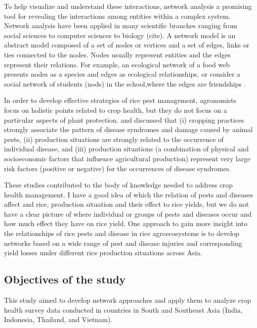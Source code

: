 To help visualize and understand these interactions, network analysis a promising tool for revealing the interactions among entities within a complex system. Network analysis have been applied in many scientific branches ranging from social sciences to computer sciences to biology (cite). A network model is an abstract model composed of a set of nodes or vertices and a set of edges, links or ties connected to the nodes. Nodes usually represent entities and the edges represent their relations. For example, an ecological network of a food web presents nodes as a species \citep{Krause_2003_Compartments}and edges as ecological relationships, or consider a social network of students (nods) in the school,where the edges are friendships \citep{Moody_2001_Race}.

In order to develop effective strategies of rice pest management, agronomists focus on holistic points related to crop health, but they do not focus on a particular aspects of plant protection. \citet{Savary_1995_Use,Savary_2000_Quantification} and \citet{Savary_2005_Multiple} discussed that (i) cropping practices strongly associate the pattern of disease syndromes and damage caused by animal pests, (ii) production situations are strongly related to the occurrence of individual disease, and (iii) production situations (a combination of physical and socioeconomic factors that influence agricultural production) represent very large risk factors (positive or negative) for the occurrences of disease syndromes.

These studies contributed to the body of knowledge needed to address crop health management. I have a good idea of which the relation of pests and diseases  affect and rice, production situation and their effect to rice yields, but we do not have a clear picture of where individual or groups of pests and diseases occur and how much effect they have on rice yield. One approach to gain more insight into the relationships of rice pests and disease in rice agroecosystems is to develop networks based on a wide range of pest and disease injuries and corresponding yield losses under different rice production situations across Asia. 


\subsection{Objectives of the study}

This study aimed to develop network approaches and apply them to analyze crop health survey data conducted in countries in South and Southeast Asia (India, Indonesia, Thailand, and Vietnam). 

